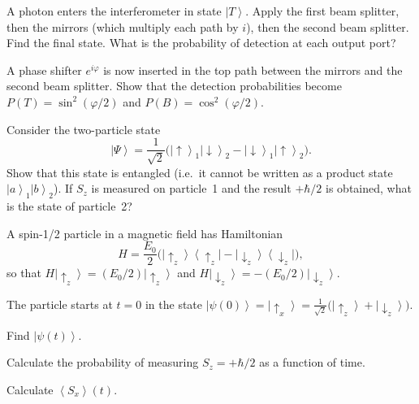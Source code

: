 \documentclass[12pt,a4paper]{article}
\renewcommand{\ket}[1]{\left|#1\right\rangle}
\renewcommand{\ketbra}[2]{\left|#1\right\rangle\!\left\langle #2\right|}
\renewcommand{\expect}[1]{\left\langle #1\right\rangle}
\begin{document}
\begin{parts}
\item A photon enters the interferometer in state $\ket{T}$. Apply the first beam splitter, then the mirrors (which multiply each path by $i$), then the second beam splitter. Find the final state. What is the probability of detection at each output port? 

\item A phase shifter $e^{i\varphi}$ is now inserted in the top path between the mirrors and the second beam splitter. Show that the detection probabilities become $P(T) = \sin^2(\varphi/2)$ and $P(B) = \cos^2(\varphi/2)$. 

\item Consider the two-particle state
\[
\ket{\Psi} = \frac{1}{\sqrt{2}}\bigl(\ket{\!\uparrow}_1\ket{\!\downarrow}_2 - \ket{\!\downarrow}_1\ket{\!\uparrow}_2\bigr).
\]
Show that this state is entangled (i.e.\ it cannot be written as a product state $\ket{a}_1\ket{b}_2$). If $S_z$ is measured on particle~1 and the result $+\hbar/2$ is obtained, what is the state of particle~2? 

\item A spin-1/2 particle in a magnetic field has Hamiltonian
\[
H = \frac{E_0}{2}\bigl(\ketbra{\!\uparrow_z}{\uparrow_z\!} - \ketbra{\!\downarrow_z}{\downarrow_z\!}\bigr),
\]
so that $H\ket{\!\uparrow_z} = (E_0/2)\ket{\!\uparrow_z}$ and $H\ket{\!\downarrow_z} = -(E_0/2)\ket{\!\downarrow_z}$.

The particle starts at $t = 0$ in the state $\ket{\psi(0)} = \ket{\!\uparrow_x} = \frac{1}{\sqrt{2}}\bigl(\ket{\!\uparrow_z} + \ket{\!\downarrow_z}\bigr)$.
\begin{parts}
\item Find $\ket{\psi(t)}$.
\item Calculate the probability of measuring $S_z = +\hbar/2$ as a function of time.
\item Calculate $\expect{S_x}(t)$.
\end{parts}
\end{parts}

\newpage


\end{document}
